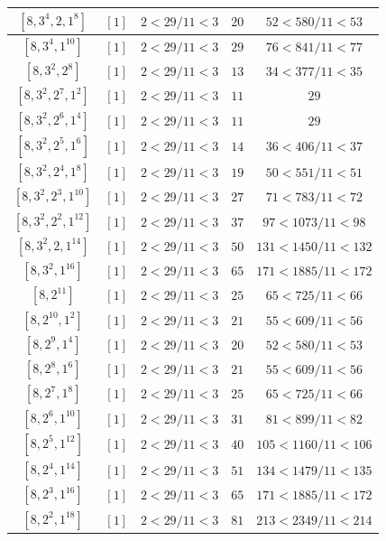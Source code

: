 \documentclass{article}%
\begin{document}
\begin{center}
\begin{longtable}{||c|c|c|c|c||}
$[8, 3^{4}, 2, 1^{8}]$ & $[1]$ & $2 < 29/11 < 3$ & $20$ & $52 < 580/11 < 53$ \\ \hline 
$[8, 3^{4}, 1^{10}]$ & $[1]$ & $2 < 29/11 < 3$ & $29$ & $76 < 841/11 < 77$ \\ \hline 
$[8, 3^{2}, 2^{8}]$ & $[1]$ & $2 < 29/11 < 3$ & $13$ & $34 < 377/11 < 35$ \\ \hline 
$[8, 3^{2}, 2^{7}, 1^{2}]$ & $[1]$ & $2 < 29/11 < 3$ & $11$ & $29$ \\ \hline 
$[8, 3^{2}, 2^{6}, 1^{4}]$ & $[1]$ & $2 < 29/11 < 3$ & $11$ & $29$ \\ \hline 
$[8, 3^{2}, 2^{5}, 1^{6}]$ & $[1]$ & $2 < 29/11 < 3$ & $14$ & $36 < 406/11 < 37$ \\ \hline 
$[8, 3^{2}, 2^{4}, 1^{8}]$ & $[1]$ & $2 < 29/11 < 3$ & $19$ & $50 < 551/11 < 51$ \\ \hline 
$[8, 3^{2}, 2^{3}, 1^{10}]$ & $[1]$ & $2 < 29/11 < 3$ & $27$ & $71 < 783/11 < 72$ \\ \hline 
$[8, 3^{2}, 2^{2}, 1^{12}]$ & $[1]$ & $2 < 29/11 < 3$ & $37$ & $97 < 1073/11 < 98$ \\ \hline 
$[8, 3^{2}, 2, 1^{14}]$ & $[1]$ & $2 < 29/11 < 3$ & $50$ & $131 < 1450/11 < 132$ \\ \hline 
$[8, 3^{2}, 1^{16}]$ & $[1]$ & $2 < 29/11 < 3$ & $65$ & $171 < 1885/11 < 172$ \\ \hline 
$[8, 2^{11}]$ & $[1]$ & $2 < 29/11 < 3$ & $25$ & $65 < 725/11 < 66$ \\ \hline 
$[8, 2^{10}, 1^{2}]$ & $[1]$ & $2 < 29/11 < 3$ & $21$ & $55 < 609/11 < 56$ \\ \hline 
$[8, 2^{9}, 1^{4}]$ & $[1]$ & $2 < 29/11 < 3$ & $20$ & $52 < 580/11 < 53$ \\ \hline 
$[8, 2^{8}, 1^{6}]$ & $[1]$ & $2 < 29/11 < 3$ & $21$ & $55 < 609/11 < 56$ \\ \hline 
$[8, 2^{7}, 1^{8}]$ & $[1]$ & $2 < 29/11 < 3$ & $25$ & $65 < 725/11 < 66$ \\ \hline 
$[8, 2^{6}, 1^{10}]$ & $[1]$ & $2 < 29/11 < 3$ & $31$ & $81 < 899/11 < 82$ \\ \hline 
$[8, 2^{5}, 1^{12}]$ & $[1]$ & $2 < 29/11 < 3$ & $40$ & $105 < 1160/11 < 106$ \\ \hline 
$[8, 2^{4}, 1^{14}]$ & $[1]$ & $2 < 29/11 < 3$ & $51$ & $134 < 1479/11 < 135$ \\ \hline 
$[8, 2^{3}, 1^{16}]$ & $[1]$ & $2 < 29/11 < 3$ & $65$ & $171 < 1885/11 < 172$ \\ \hline 
$[8, 2^{2}, 1^{18}]$ & $[1]$ & $2 < 29/11 < 3$ & $81$ & $213 < 2349/11 < 214$ \\ \hline 

\end{longtable}
\end{center}
\end{document}
